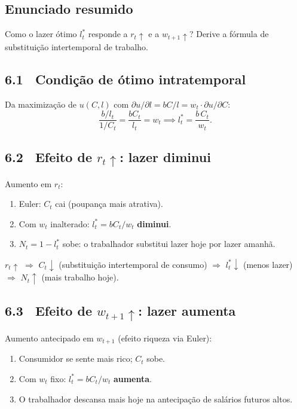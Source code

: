 \documentclass[12pt, a4paper]{article}
\begin{document}
\subsection*{Enunciado resumido}
Como o lazer ótimo $l_t^*$ responde a $r_t\uparrow$ e a $w_{t+1}\uparrow$?
Derive a fórmula de substituição intertemporal de trabalho.

\subsection*{6.1 \ Condição de ótimo intratemporal}

Da maximização de $u(C,l)$ com $\partial u/\partial l = bC/l = w_t\cdot\partial u/\partial C$:
\[
\frac{b/l_t}{1/C_t} = \frac{bC_t}{l_t} = w_t
\implies
l_t^* = \frac{b\,C_t}{w_t}.
\]

\subsection*{6.2 \ Efeito de $r_t\uparrow$: lazer diminui}

Aumento em $r_t$:
\begin{enumerate}[leftmargin=1.5em, topsep=2pt, itemsep=2pt]
  \item Euler: $C_t$ cai (poupança mais atrativa).
  \item Com $w_t$ inalterado: $l_t^* = bC_t/w_t$ \textbf{diminui}.
  \item $N_t = 1-l_t^*$ sobe: o trabalhador substitui lazer hoje por lazer amanhã.
\end{enumerate}

\begin{resultbox}[title={Lazer e taxa de juros (Q6a)}]
$r_t\uparrow$ $\Rightarrow$ $C_t\downarrow$ (substituição intertemporal de consumo)
$\Rightarrow$ $l_t^*\downarrow$ (menos lazer) $\Rightarrow$ $N_t\uparrow$ (mais trabalho hoje).
\end{resultbox}

\subsection*{6.3 \ Efeito de $w_{t+1}\uparrow$: lazer aumenta}

Aumento antecipado em $w_{t+1}$ (efeito riqueza via Euler):
\begin{enumerate}[leftmargin=1.5em, topsep=2pt, itemsep=2pt]
  \item Consumidor se sente mais rico; $C_t$ sobe.
  \item Com $w_t$ fixo: $l_t^* = bC_t/w_t$ \textbf{aumenta}.
  \item O trabalhador descansa mais hoje na antecipação de salários futuros altos.
\end{enumerate}
\end{document}
